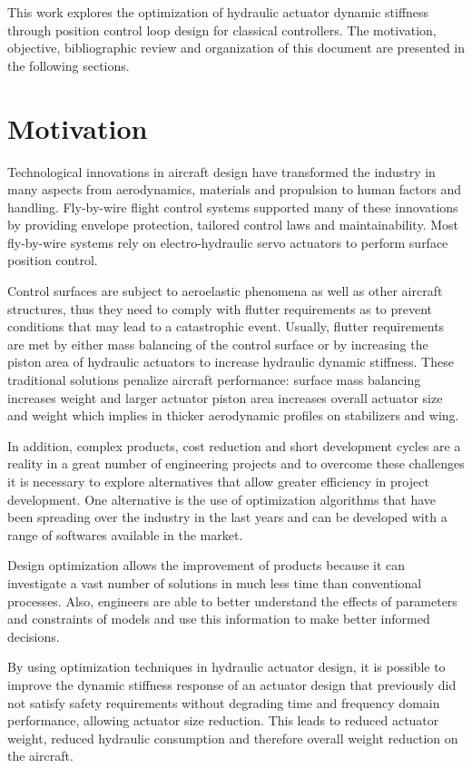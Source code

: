 
This work explores the optimization of hydraulic actuator dynamic stiffness through position control loop design for classical controllers. The motivation, objective, bibliographic review and organization of this document are presented in the following sections.

\section{Motivation} \label{1-1-Motivation}

Technological innovations in aircraft design have transformed the industry in many aspects from aerodynamics, materials and propulsion to human factors and handling. Fly-by-wire flight control systems supported many of these innovations by providing envelope protection, tailored control laws and maintainability. Most fly-by-wire systems rely on electro-hydraulic servo actuators to perform surface position control.

Control surfaces are subject to aeroelastic phenomena as well as other aircraft structures, thus they need to comply with flutter requirements as to prevent conditions that may lead to a catastrophic event. Usually, flutter requirements are met by either mass balancing of the control surface or by increasing the piston area of hydraulic actuators to increase hydraulic dynamic stiffness. These traditional solutions penalize aircraft performance: surface mass balancing increases weight and larger actuator piston area increases overall actuator size and weight which implies in thicker aerodynamic profiles on stabilizers and wing. 

In addition, complex products, cost reduction and short development cycles are a reality in a great number of engineering projects and to overcome these challenges it is necessary to explore alternatives that allow greater efficiency in project development. One alternative is the use of optimization algorithms that have been spreading over the industry in the last years and can be developed with a range of softwares available in the market. 

Design optimization allows the improvement of products because it can investigate a vast number of solutions in much less time than conventional processes. Also, engineers are able to better understand the effects of parameters and constraints of models and use this information to make better informed decisions. 

By using optimization techniques in hydraulic actuator design, it is possible to improve the dynamic stiffness response of an actuator design that previously did not satisfy safety requirements without degrading time and frequency domain performance, allowing actuator size reduction. This leads to reduced actuator weight, reduced hydraulic consumption and therefore overall weight reduction on the aircraft.

